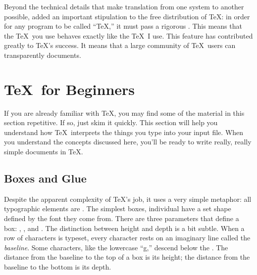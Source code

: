 Beyond the technical details that make translation from one system to
another possible,  added an 
important stipulation to
the free distribution of \TeX: in order for any program to be called
``\TeX,'' it must pass a rigorous .  This means that
the \TeX\ you use behaves exactly like the \TeX\ I use.  This feature has
contributed greatly to \TeX's success.  It means that a large
community of \TeX\ users can transparently
 documents.

\section{\protect\TeX\ for Beginners}
\label{sec:texforbeginners}

If you are already familiar with \TeX, you may find some of the
material in this section repetitive.  If so, just skim it quickly.
This section will help you understand how \TeX\ interprets the things
you type into your input file.  When you understand the concepts
discussed here, you'll be ready to write really, really simple
documents in \TeX.

\subsection{Boxes and Glue}

Despite the apparent complexity of \TeX's job, it uses a very simple
metaphor: all typographic elements are .  The simplest boxes,
individual  have 
a set shape
defined by the font they come from.  There are three parameters
that define a box: 
, 
,
and .   
The distinction between height and
depth is a bit subtle.  When a row of characters is typeset,
every character rests on an imaginary line called the \textit{baseline}.  
Some characters, like the lowercase ``g,'' 
descend below the .
The distance from the baseline to
the top of a box is its height; the distance from the baseline to the
bottom is its depth.  

